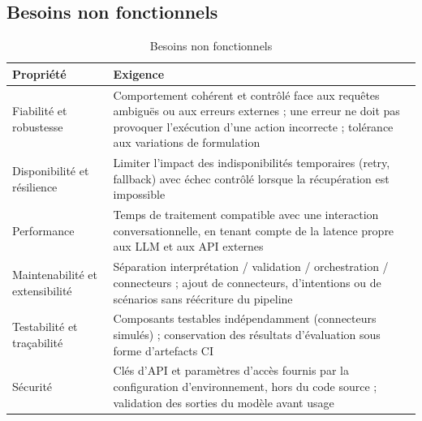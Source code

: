 \documentclass[11pt,a4paper,openany,oneside]{report}
\begin{document}
\subsection{Besoins non fonctionnels}
\begin{table}[htbp]
\centering\small
\caption{Besoins non fonctionnels}\label{tab:bnf}
\begin{tabularx}{\textwidth}{@{}p{3cm}X@{}}
\toprule
\textbf{Propriété} & \textbf{Exigence} \\
\midrule
Fiabilité et robustesse & Comportement cohérent et contrôlé face aux requêtes ambiguës ou aux erreurs externes ; une erreur ne doit pas provoquer l'exécution d'une action incorrecte ; tolérance aux variations de formulation \\
Disponibilité et résilience & Limiter l'impact des indisponibilités temporaires (retry, fallback) avec échec contrôlé lorsque la récupération est impossible \\
Performance & Temps de traitement compatible avec une interaction conversationnelle, en tenant compte de la latence propre aux LLM et aux API externes \\
Maintenabilité et extensibilité & Séparation interprétation / validation / orchestration / connecteurs ; ajout de connecteurs, d'intentions ou de scénarios sans réécriture du pipeline \\
Testabilité et traçabilité & Composants testables indépendamment (connecteurs simulés) ; conservation des résultats d'évaluation sous forme d'artefacts CI \\
Sécurité & Clés d'API et paramètres d'accès fournis par la configuration d'environnement, hors du code source ; validation des sorties du modèle avant usage \\
\bottomrule
\end{tabularx}
\end{table}
\end{document}
